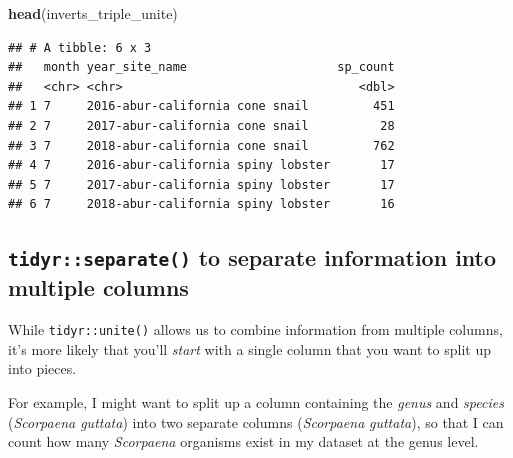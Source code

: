 \documentclass[]{book}
\newenvironment{Shaded}{\begin{snugshade}}{\end{snugshade}}
\newcommand{\CommentTok}[1]{\textcolor[rgb]{0.56,0.35,0.01}{\textit{#1}}}
\newcommand{\DataTypeTok}[1]{\textcolor[rgb]{0.13,0.29,0.53}{#1}}
\newcommand{\KeywordTok}[1]{\textcolor[rgb]{0.13,0.29,0.53}{\textbf{#1}}}
\newcommand{\NormalTok}[1]{#1}
\newcommand{\OperatorTok}[1]{\textcolor[rgb]{0.81,0.36,0.00}{\textbf{#1}}}
\newcommand{\StringTok}[1]{\textcolor[rgb]{0.31,0.60,0.02}{#1}}
\begin{document}
\begin{Shaded}
\end{Shaded}

\begin{Shaded}
\begin{Highlighting}[]
\KeywordTok{head}\NormalTok{(inverts_triple_unite)}
\end{Highlighting}
\end{Shaded}

\begin{verbatim}
## # A tibble: 6 x 3
##   month year_site_name                     sp_count
##   <chr> <chr>                                 <dbl>
## 1 7     2016-abur-california cone snail         451
## 2 7     2017-abur-california cone snail          28
## 3 7     2018-abur-california cone snail         762
## 4 7     2016-abur-california spiny lobster       17
## 5 7     2017-abur-california spiny lobster       17
## 6 7     2018-abur-california spiny lobster       16
\end{verbatim}

\hypertarget{tidyrseparate-to-separate-information-into-multiple-columns}{%
\subsection{\texorpdfstring{\texttt{tidyr::separate()} to separate information into multiple columns}{tidyr::separate() to separate information into multiple columns}}\label{tidyrseparate-to-separate-information-into-multiple-columns}}

While \texttt{tidyr::unite()} allows us to combine information from multiple columns, it's more likely that you'll \emph{start} with a single column that you want to split up into pieces.

For example, I might want to split up a column containing the \emph{genus} and \emph{species} (\emph{Scorpaena guttata}) into two separate columns (\emph{Scorpaena} \textbar{} \emph{guttata}), so that I can count how many \emph{Scorpaena} organisms exist in my dataset at the genus level.
\end{document}
